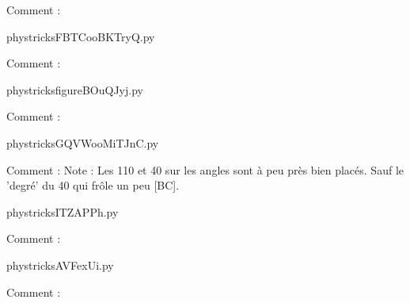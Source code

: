    Comment : 

    \clearpage
    


    \newcommand{\CaptionFigFBTCooBKTryQ}{<+Type your caption here+>}
    \begin{center}
        
    \end{center}
    phystricksFBTCooBKTryQ.py

    Comment : 

    \clearpage
    


    \newcommand{\CaptionFigfigureBOuQJyj}{<+Type your caption here+>}
    \begin{center}
        
    \end{center}
    phystricksfigureBOuQJyj.py

    Comment : 

    \clearpage
    


    \newcommand{\CaptionFigGQVWooMiTJnC}{<+Type your caption here+>}
    \begin{center}
        
    \end{center}
    phystricksGQVWooMiTJnC.py

    Comment : Note : Les 110 et 40 sur les angles sont à peu près bien placés. Sauf le 'degré' du 40 qui frôle un peu [BC].

    \clearpage
    


    \newcommand{\CaptionFigITZAPPh}{<+Type your caption here+>}
    \begin{center}
        
    \end{center}
    phystricksITZAPPh.py

    Comment : 

    \clearpage
    


    \newcommand{\CaptionFigAVFexUi}{<+Type your caption here+>}
    \begin{center}
        
    \end{center}
    phystricksAVFexUi.py

    Comment : 

